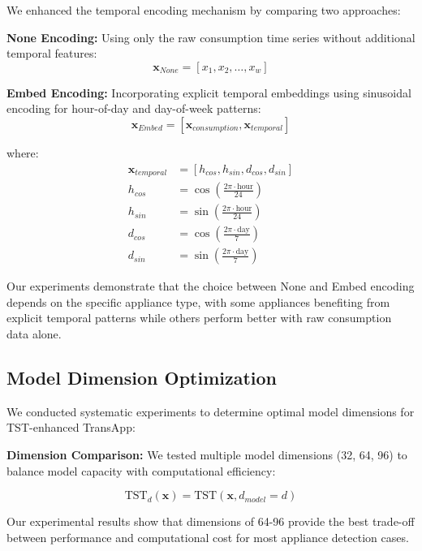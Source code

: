 \documentclass[conference]{IEEEtran}
\begin{document}
We enhanced the temporal encoding mechanism by comparing two approaches:

\textbf{None Encoding:} Using only the raw consumption time series without additional temporal features:
\begin{equation}
\mathbf{x}_{None} = [x_1, x_2, \ldots, x_w]
\end{equation}

\textbf{Embed Encoding:} Incorporating explicit temporal embeddings using sinusoidal encoding for hour-of-day and day-of-week patterns:
\begin{equation}
\mathbf{x}_{Embed} = [\mathbf{x}_{consumption}, \mathbf{x}_{temporal}]
\end{equation}

where:
\begin{align}
\mathbf{x}_{temporal} &= [h_{cos}, h_{sin}, d_{cos}, d_{sin}] \\
h_{cos} &= \cos\left(\frac{2\pi \cdot \text{hour}}{24}\right) \\
h_{sin} &= \sin\left(\frac{2\pi \cdot \text{hour}}{24}\right) \\
d_{cos} &= \cos\left(\frac{2\pi \cdot \text{day}}{7}\right) \\
d_{sin} &= \sin\left(\frac{2\pi \cdot \text{day}}{7}\right)
\end{align}

Our experiments demonstrate that the choice between None and Embed encoding depends on the specific appliance type, with some appliances benefiting from explicit temporal patterns while others perform better with raw consumption data alone.

\subsection{Model Dimension Optimization}

We conducted systematic experiments to determine optimal model dimensions for TST-enhanced TransApp:

\textbf{Dimension Comparison:} We tested multiple model dimensions (32, 64, 96) to balance model capacity with computational efficiency:

\begin{equation}
\text{TST}_{d}(\mathbf{x}) = \text{TST}(\mathbf{x}, d_{model}=d)
\end{equation}

Our experimental results show that dimensions of 64-96 provide the best trade-off between performance and computational cost for most appliance detection cases.
\end{document}
